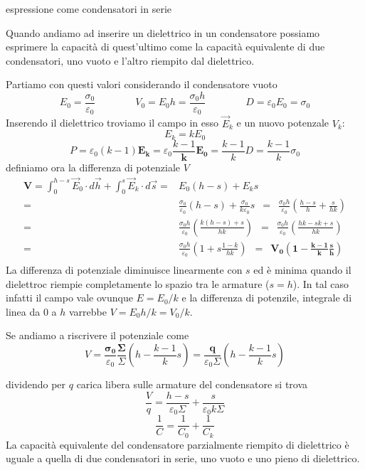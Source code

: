 \documentclass[x11names]{report}
\newcommand{\esempio}[2]{
	\begin{es}{#1}
		#2
	\end{es}
}
\begin{document}
\newpage
\esempio{espressione come condensatori in serie}{
Quando andiamo ad inserire un dielettrico in un condensatore possiamo esprimere la capacità di quest'ultimo come la capacità equivalente di due condensatori, uno vuoto e l'altro riempito dal dielettrico.

Partiamo con questi valori considerando il condensatore vuoto
\[
E_0 = \frac{\sigma_0}{\varepsilon_0} \qquad \qquad V_0 = E_0 h = \frac{\sigma_0 h}{\varepsilon_0} \qquad \qquad D = \varepsilon_0 E_0 = \sigma_0
\]
Inserendo il dielettrico troviamo il campo in esso \(\vec{E}_k\) e un nuovo potenzale \(V_k\):
\[
E_k = kE_0
\]
\[
P = \varepsilon_0(k-1)\boldsymbol{E_k} = \varepsilon_0 \frac{k-1}{\boldsymbol{k}}\boldsymbol{E_0} = \frac{k-1}{k}D = \frac{k-1}{k}\sigma_0
\]
definiamo ora la differenza di potenziale \(V\)
\begin{align*}
	\boldsymbol{V= }\int_{0}^{h-s}\vec{E}_0\cdot d\vec{h} + \int_{0}^{s}\vec{E}_k\cdot d\vec{s} =& E_0(h-s) + E_ks \\
	 =& \frac{\sigma_0}{\varepsilon_0}(h-s) + \frac{\sigma_0}{k\varepsilon_0}s \;\  = \;\ \frac{\sigma_0 h}{\varepsilon_0} \left(\frac{h-s}{h} + \frac{s}{hk}\right)\\
	 =& \frac{\sigma_0 h}{\varepsilon_0} \left(\frac{k(h-s) + s}{hk} \right) \;\ = \;\ \frac{\sigma_0 h}{\varepsilon_0} \left(\frac{hk - sk +s}{hk} \right) \\
	 =& \frac{\sigma_0 h}{\varepsilon_0} \left(1 + s\frac{1-k}{hk} \right) \;\ \boldsymbol{=} \;\ \boldsymbol{V_0\left(1 - \frac{k-1}{k}\frac{s}{h} \right)} \\
\end{align*}
La differenza di potenziale diminuisce linearmente con \(s\) ed è minima quando il dielettroc riempie completamente lo spazio tra le armature (\(s = h\)). In tal caso infatti il campo vale ovunque \(E = E_0/k\) e la differenza di potenzile, integrale di linea da \(0\) a \(h\) varrebbe \(V = E_0h/k = V_0/k\).

Se andiamo a riscrivere il potenziale come
\[
V = \frac{\boldsymbol{\sigma_0}}{\varepsilon_0}\frac{\boldsymbol{\Sigma}}{\Sigma}\left(h - \frac{k-1}{k}s\right) = \frac{\boldsymbol{q}}{\varepsilon_0\Sigma}\left(h-\frac{k-1}{k}s\right)
\]
}
dividendo per \(q\) carica libera sulle armature del condensatore si trova
\[
\frac{V}{q} = \frac{h-s}{\varepsilon_0 \Sigma} + \frac{s}{\varepsilon_0 k \Sigma}
\]
\[
\frac{1}{C} = \frac{1}{C_0} + \frac{1}{C_k}
\]
La capacità equivalente del condensatore parzialmente riempito di dielettrico è uguale a quella di due condensatori in serie, uno vuoto e uno pieno di dielettrico.
\end{document}
